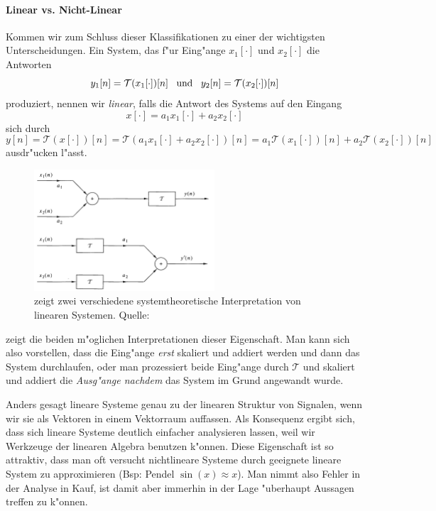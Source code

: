 \paragraph{Linear vs. Nicht-Linear} Kommen wir zum Schluss dieser Klassifikationen zu einer der wichtigsten Unterscheidungen.
Ein System, das f"ur Eing"ange $x_1[\cdot]$ und $x_2[\cdot]$ die Antworten
\[
    y_1[n] = \mathcal{T}(x_1[\cdot])[n]
    {\hspace{3mm} \text{und} \hspace{3mm}}
    y_2[n] = \mathcal{T}(x_2[\cdot])[n]
\]
produziert, nennen wir \emph{linear}, falls die Antwort des Systems auf den Eingang
\[
    x[\cdot] = a_1 x_1[\cdot] + a_2 x_2[\cdot]
\]
sich durch
\[
    y[n]
        = \mathcal{T}(x[\cdot])[n] 
        = \mathcal{T}(a_1 x_1[\cdot] + a_2 x_2[\cdot])[n] 
        = a_1 \mathcal{T}(x_1[\cdot])[n] 
            + a_2 \mathcal{T}(x_2[\cdot])[n] 
\]
ausdr"ucken l"asst.
%
\begin{figure}
    \centering\includegraphics[width=0.6\textwidth]{img/disc_sys/linear_sys.png}
    \caption{zeigt zwei verschiedene systemtheoretische Interpretation von linearen Systemen. Quelle: \cite{proakis2013}}\label{img:disc_sys:linear_sys}
\end{figure}
%

 zeigt die beiden m"oglichen Interpretationen dieser Eigenschaft.
Man kann sich also vorstellen, dass die Eing"ange \emph{erst} skaliert und addiert werden und dann das System durchlaufen, oder man prozessiert beide Eing"ange durch $\mathcal{T}$ und skaliert und addiert die \emph{Ausg"ange nachdem} das System im Grund  angewandt wurde.

Anders gesagt  lineare Systeme genau zu der linearen Struktur von Signalen, wenn wir sie als Vektoren in einem Vektorraum auffassen.
Als Konsequenz ergibt sich, dass sich lineare Systeme deutlich einfacher analysieren lassen, weil wir Werkzeuge der linearen Algebra benutzen k"onnen.
Diese Eigenschaft ist so attraktiv, dass man oft versucht nichtlineare Systeme durch geeignete lineare System zu approximieren (Bsp: Pendel $\sin(x) \approx x$).
Man nimmt also Fehler in der Analyse in Kauf, ist damit aber immerhin in der Lage "uberhaupt Aussagen treffen zu k"onnen.
%
